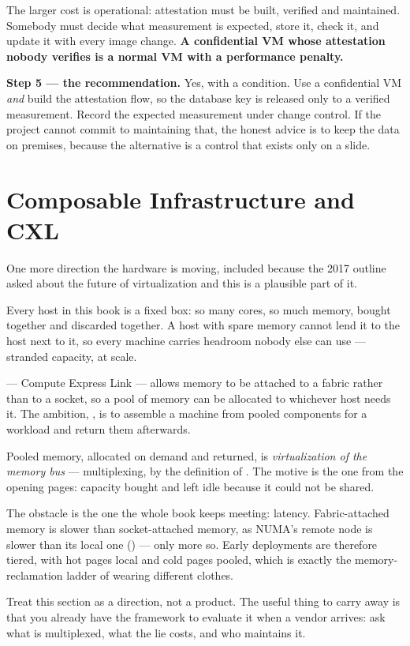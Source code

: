 \begin{worked}
\smallskip
The larger cost is operational: attestation must be built, verified and
maintained. Somebody must decide what measurement is expected, store it, check
it, and update it with every image change. \textbf{A confidential VM whose
attestation nobody verifies is a normal VM with a performance penalty.}

\smallskip
\textbf{Step 5 --- the recommendation.} Yes, with a condition. Use a
confidential VM \emph{and} build the attestation flow, so the database key is
released only to a verified measurement. Record the expected measurement under
change control. If the project cannot commit to maintaining that, the honest
advice is to keep the data on premises, because the alternative is a control
that exists only on a slide.
\end{worked}

\section{Composable Infrastructure and CXL}

One more direction the hardware is moving, included because the 2017 outline
asked about the future of virtualization and this is a plausible part of it.

Every host in this book is a fixed box: so many cores, so much memory, bought
together and discarded together. A host with spare memory cannot lend it to the
host next to it, so every machine carries headroom nobody else can use ---
stranded capacity, at scale.

 --- Compute Express Link --- allows memory to be attached to a fabric
rather than to a socket, so a pool of memory can be allocated to whichever host
needs it. The ambition, , is to assemble a
machine from pooled components for a workload and return them afterwards.

\begin{conceptbox}
Pooled memory, allocated on demand and returned, is \emph{virtualization of the
memory bus} --- multiplexing, by the definition of . The motive is
the one from the opening pages: capacity bought and left idle because it could
not be shared.

\smallskip
The obstacle is the one the whole book keeps meeting: latency. Fabric-attached
memory is slower than socket-attached memory, as NUMA's remote node is slower
than its local one () --- only more so. Early deployments are
therefore tiered, with hot pages local and cold pages pooled, which is exactly
the memory-reclamation ladder of  wearing different clothes.

\smallskip
Treat this section as a direction, not a product. The useful thing to carry
away is that you already have the framework to evaluate it when a vendor
arrives: ask what is multiplexed, what the lie costs, and who maintains it.
\end{conceptbox}

